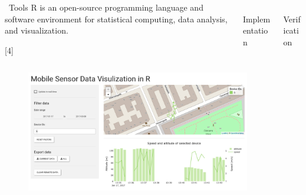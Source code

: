 \documentclass[final]{beamer}
\newlength{\onecolwid}
\newlength{\twocolwid}
\begin{document}
\begin{frame}[t]
\begin{columns}[t]
\begin{column}{\twocolwid}
	\begin{columns}[t, totalwidth=\twocolwid]
		\begin{column}{\onecolwid}\vspace{-.6in}
			\begin{block}{\faWrench \, Tools}
				R is an open-source programming language and software environment for statistical computing, data analysis, and visualization.

				[4]
				\lipsum[66]
			\end{block}
		\end{column}

		\begin{column}{\onecolwid}\vspace{-.6in}
			\begin{block}{\faCode \, Implementation}
				\blindtext
				\lipsum[75]
				\lipsum[66]
			\end{block}
		\end{column}
	\end{columns}

	\begin{figure}
		\includegraphics[width=\twocolwid]{ss_ui.png}
	\end{figure}

	\vspace{2cm}

	\begin{center}
		\ccbynd
	\end{center}
\end{column}

\begin{column}{\onecolwid}
	\begin{block}{\faCheckCircle \, Verification}
		\lipsum[75]
		\lipsum[66]
	\end{block}


\end{column}
\end{columns}
\end{frame}
\end{document}
